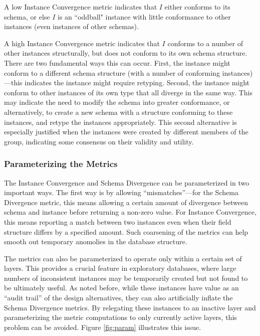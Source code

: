 A low Instance Convergence metric indicates that $I$ either conforms to its schema, or else $I$ is an ``oddball" instance with little conformance to other instances (even instances of other schemas).

A high Instance Convergence metric indicates that $I$ conforms to a number of other instances structurally, but does not conform to its own schema structure.  There are two fundamental ways this can occur.  First, the instance might conform to a different schema structure (with a number of conforming instances)---this indicates the instance might require retyping.  Second, the instance might conform to other instances of its own type that all diverge in the same way.  This may indicate the need to modify the schema into greater conformance, or alternatively, to create a new schema with a structure conforming to these instances, and retype the instances appropriately.  This second alternative is especially justified when the instances were created by different members of the group, indicating some consensus on their validity and utility.

\subsubsection{Parameterizing the Metrics}

The Instance Convergence and Schema Divergence can be parameterized in two important ways. The first way is by allowing ``mismatches''---for the Schema Divergence metric, this means allowing a certain amount of divergence between schema and instance before returning a non-zero value.  For Instance Convergence, this means reporting a match between two instances even when their field structure differs by a specified amount.  Such coarsening of the metrics can help smooth out temporary anomolies in the database structure.

The metrics can also be parameterized to operate only within a certain set of layers.  This provides a crucial feature in exploratory databases, where large numbers of inconsistent instances may be temporarily created but not found to be ultimately useful.  As noted before, while these instances have value as an ``audit trail'' of the design alternatives, they can also artificially inflate the Schema Divergence metrics.  By relegating these instances to an inactive layer and parameterizing the metric computations to only currently active layers, this problem can be avoided. Figure \ref{fig:param} illustrates this issue.

